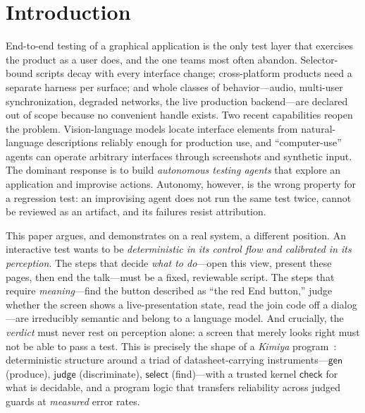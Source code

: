 \documentclass[acmsmall,screen,nonacm]{acmart}
\newcommand{\gen}{\mathsf{gen}}
\newcommand{\checkk}{\mathsf{check}}
\newcommand{\judge}{\mathsf{judge}}
\newcommand{\select}{\mathsf{select}}
\theoremstyle{acmdefinition}%
\theoremstyle{acmplain}%
\begin{document}

\maketitle

\section{Introduction}
\label{sec:intro}

End-to-end testing of a graphical application is the only test layer that
exercises the product as a user does, and the one teams most often
abandon. Selector-bound scripts decay with every interface change;
cross-platform products need a separate harness per surface; and whole
classes of behavior---audio, multi-user synchronization, degraded
networks, the live production backend---are declared out of scope because
no convenient handle exists. Two recent capabilities reopen the problem.
Vision-language models locate interface elements from natural-language
descriptions reliably enough for production use, and ``computer-use''
agents can operate arbitrary interfaces through screenshots and synthetic
input. The dominant response is to build \emph{autonomous testing
agents} that explore an application and improvise actions. Autonomy,
however, is the wrong property for a regression test: an improvising
agent does not run the same test twice, cannot be reviewed as an
artifact, and its failures resist attribution.

This paper argues, and demonstrates on a real system, a different
position. An interactive test wants to be \emph{deterministic in its
control flow and calibrated in its perception}. The steps that decide
\emph{what to do}---open this view, present these pages, then end the
talk---must be a fixed, reviewable script. The steps that require
\emph{meaning}---find the button described as ``the red End
button,'' judge whether the screen shows a live-presentation state, read
the join code off a dialog---are irreducibly semantic and belong to a
language model. And crucially, the \emph{verdict} must never rest on
perception alone: a screen that merely looks right must not be able to
pass a test. This is precisely the shape of a \emph{Kimiya}
program~\citep{kimiya}: deterministic structure around a triad of
datasheet-carrying instruments---$\gen$ (produce), $\judge$
(discriminate), $\select$ (find)---with a trusted kernel $\checkk$ for
what is decidable, and a program logic that transfers reliability across
judged guards at \emph{measured} error rates.
\end{document}
